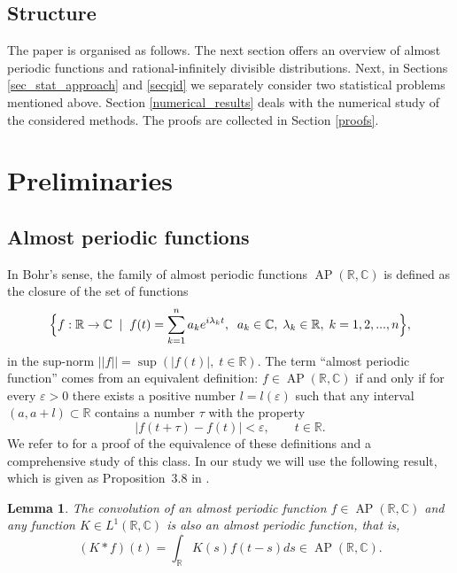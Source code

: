 \documentclass[numbers,webpdf,imaiai]{ima-authoring-template}%
\theoremstyle{thmstyletwo}%
\newtheorem{lemma}{Lemma}%
\newcommand{\R}{\mathbb{R}}
\newcommand{\C}{\mathbb{C}}
\newcommand{\AP}{\operatorname{AP}}
\numberwithin{equation}{section}
\begin{document}
\subsection{Structure}
The paper is organised as follows. The next section offers an overview of almost periodic functions and rational-infinitely divisible distributions.  Next, in Sections \ref{sec_stat_approach} and \ref{secqid} we separately consider two statistical problems mentioned above.  Section \ref{numerical_results} deals with the numerical study of the considered methods. The proofs are collected in Section \ref{proofs}. %

\section{Preliminaries}
\subsection{Almost periodic functions}
In Bohr's sense, the family of almost periodic functions  $\AP(\R, \C)$  is defined as the closure of the set of functions 
 \begin{equation*}
\Bigl\{ 
 f: \R \to \C \;\; |
 \;\;
 f(t)=\sum_{k=1}^{n} a_k e^{i\lambda_kt}, \;\; a_k \in \C, \; \lambda_k \in \R, \; k=1, 2, ..., n
 \Bigr\},
 \end{equation*}
in the sup-norm \(
||f|| = \sup(|f(t)|, \; t \in \R)\). The term ``almost periodic function''  comes from an equivalent definition: $f \in \AP(\R, \C)$ if and only if for every $\varepsilon > 0$ there exists a positive number $l = l(\varepsilon)$ such that any interval $(a, a + l) \subset \R$ contains a number $\tau$ with the property
\begin{equation*}
    |f(t + \tau) - f(t)| < \varepsilon, \qquad t \in \R.
\end{equation*}
We refer to  \cite{Cord2009} for a proof of the equivalence of these definitions and a comprehensive study of this class. In our study we will use the following result, which is given as Proposition~3.8 in \cite{Cord2009}.

\begin{lemma}\label{lem1}
The convolution of an almost periodic function 
$f \in \AP(\R, \C)$ and any function $K \in L^1(\R, \C)$ is also an almost periodic function, that is,  
\begin{equation*}
    (K * f)(t) = \int_{\R} K(s)f(t - s)ds \in \AP(\R, \C).
\end{equation*}
\end{lemma}
\end{document}
